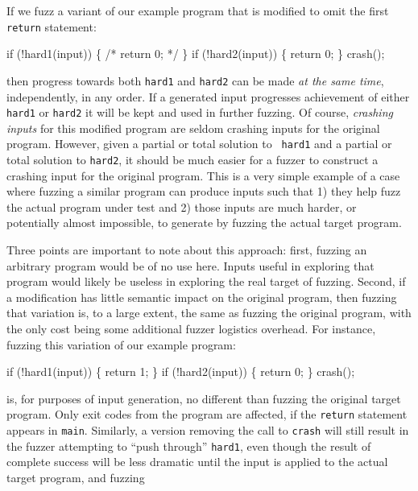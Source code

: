 If we fuzz a variant of our example program that is modified to omit the first {\tt return} statement:

\begin{code}
  if (!hard1(input)) \{
    /* return 0; */
  \}
  if (!hard2(input)) \{
      return 0;
  \}
  crash();   
\end{code}

\noindent then progress towards both {\tt hard1} and {\tt hard2} can
be made \emph{at the same time}, independently, in any order.  If a generated input progresses
achievement of either {\tt hard1} or {\tt hard2} it will be kept and
used in further fuzzing.   Of course, \emph{crashing inputs} for this
modified program are seldom crashing inputs for the
original program.  However, given a partial or total solution to {\tt
  hard1} and a partial or total solution to {\tt hard2}, it should be
much easier for a fuzzer to construct a crashing input for the
original program.  This is a very simple example of a case where
fuzzing a similar program can produce inputs such that 1) they help fuzz the
actual program under test and 2) those inputs are much harder, or
potentially almost impossible, to
generate by fuzzing the actual target program.

Three points are important to note about this approach: first, fuzzing
an arbitrary program would be of no use here.  Inputs useful in
exploring that program would likely be useless in exploring the real
target of fuzzing.  Second, if a modification has little semantic
impact on the original program, then fuzzing that variation is, to a
large extent, the same as fuzzing the original program, with the only
cost being some additional fuzzer logistics overhead.  For instance,
fuzzing this variation of our example program:

\begin{code}
  if (!hard1(input)) \{
      return 1;
  \}
  if (!hard2(input)) \{
      return 0;
  \}
  crash();   
\end{code}

\noindent is, for purposes of input generation, no different than
fuzzing the original target program.  Only exit codes from the program
are affected, if the {\tt return} statement appears in {\tt main}.
Similarly, a version removing the call to {\tt crash{}} will still result in the
fuzzer attempting to ``push through'' {\tt hard1}, even though the
result of complete success will be less dramatic until the input is
applied to the actual target program, and fuzzing

